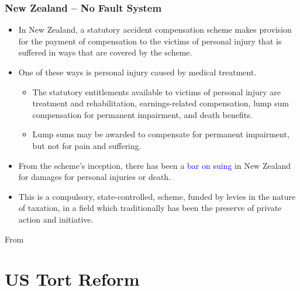 \documentclass[serif,10pt]{beamer}
\begin{document}
\begin{frame}%
\frametitle{New Zealand -- No Fault System}
  \begin{itemize}
\item In New Zealand, a statutory accident compensation scheme makes provision for the payment of compensation to the victims of personal injury that is suffered in ways that are covered by the scheme.
\item One of these ways is personal injury caused by medical treatment.
  \begin{itemize}
\item The statutory entitlements available to victims of personal injury are treatment and rehabilitation, earnings-related compensation, lump sum compensation for permanent impairment, and death benefits.
\item Lump sums may be awarded to compensate for permanent impairment, but not for pain and suffering.
\end{itemize}
\item From the scheme's inception, there has been a \textcolor{blue}{bar on suing} in New Zealand for damages for personal injuries or death.
\item This is a compulsory, state-controlled, scheme, funded by levies in the nature of taxation, in a field which traditionally has been the preserve of private action and initiative.
\end{itemize}
From \cite{todd2011treatment}
\end{frame}

\section{US Tort Reform}
\end{document}
